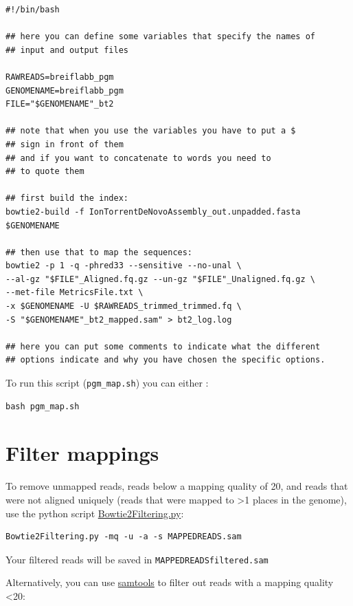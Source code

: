\documentclass[11pt]{article}
\begin{document}
\begin{verbatim}
#!/bin/bash

## here you can define some variables that specify the names of
## input and output files

RAWREADS=breiflabb_pgm
GENOMENAME=breiflabb_pgm
FILE="$GENOMENAME"_bt2

## note that when you use the variables you have to put a $
## sign in front of them
## and if you want to concatenate to words you need to
## to quote them

## first build the index:
bowtie2-build -f IonTorrentDeNovoAssembly_out.unpadded.fasta $GENOMENAME

## then use that to map the sequences:
bowtie2 -p 1 -q -phred33 --sensitive --no-unal \
--al-gz "$FILE"_Aligned.fq.gz --un-gz "$FILE"_Unaligned.fq.gz \
--met-file MetricsFile.txt \
-x $GENOMENAME -U $RAWREADS_trimmed_trimmed.fq \
-S "$GENOMENAME"_bt2_mapped.sam" > bt2_log.log

## here you can put some comments to indicate what the different
## options indicate and why you have chosen the specific options.
\end{verbatim}

To run this script (\texttt{pgm\_map.sh}) you can either :

\begin{verbatim}
bash pgm_map.sh
\end{verbatim}

\section{Filter mappings}
\label{sec-2}
To remove unmapped reads, reads below a mapping quality of 20, and
reads that were not aligned uniquely (reads that were mapped to >1
places in the genome), use the python script \href{http://marinetics.org/2015/03/03/Bowtie2Filtering.html}{Bowtie2Filtering.py}:

\begin{verbatim}
Bowtie2Filtering.py -mq -u -a -s MAPPEDREADS.sam
\end{verbatim}

Your filtered reads will be saved in \texttt{MAPPEDREADSfiltered.sam}

Alternatively, you can 
use \href{http://samtools.sourceforge.net/samtools.shtml#mpileup}{samtools} to filter out reads with a mapping quality <20:
\end{document}
